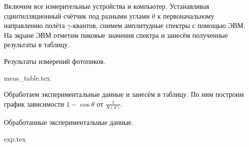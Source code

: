 Включим все измерительные устройства и компьютер.
Устанавливая сцинтилляционный счётчик под разными углами $\theta$ к первоначальному
направлению полёта $\gamma$-квантов, снимем амплитудные спектры с помощью ЭВМ.
На экране ЭВМ отметим пиковые значения спектра и занесём полученные результаты в таблицу.

\begin{table}[h!]
  \centering
  \caption{Результаты измерений фотопиков.}
  {meas_table.tex}
\end{table}

Обработаем экспериментальные данные и занесём в таблицу.
По ним построим график зависимости
$1 - \cos{\theta}$ от $\frac{1}{N(\theta)}$.

\begin{table}[h!]
  \centering
  \caption{Обработанные экспериментальные данные.}
  {exp.tex}
\end{table}